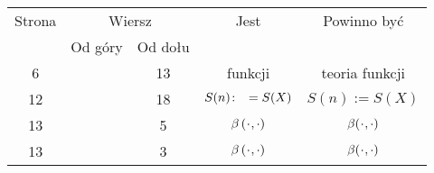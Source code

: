 \documentclass[a4paper,11pt]{article}
\numberwithin{equation}{section}
\begin{document}



\newpage



\begin{center}

  \begin{tabular}{|c|c|c|c|c|}
    \hline
    Strona & \multicolumn{2}{c|}{Wiersz} & Jest
                              & Powinno być \\ \cline{2-3}
    & Od góry & Od dołu & & \\
    \hline
    \hphantom{0}6 & & 13 & funkcji & teoria funkcji \\
    12 & & 18 & $S( n )\! : \hphantom{0} = S( X )$ & $S( n ) := S( X )$ \\
    13 & & \hphantom{0}5 & $\beta \, ( \hspace{0.05em} \cdot \hspace{0.05em} , \cdot )$
    & $\beta ( \hspace{0.05em} \cdot \hspace{0.05em} , \cdot )$ \\
    13 & & \hphantom{0}3 & $\beta \, ( \hspace{0.05em} \cdot \hspace{0.05em} , \cdot )$
    & $\beta ( \hspace{0.05em} \cdot \hspace{0.05em} , \cdot )$ \\
    \hline
  \end{tabular}

\end{center}

\VerSpaceTwo


\noindent
{} \\












\printbibliography





\end{document}
